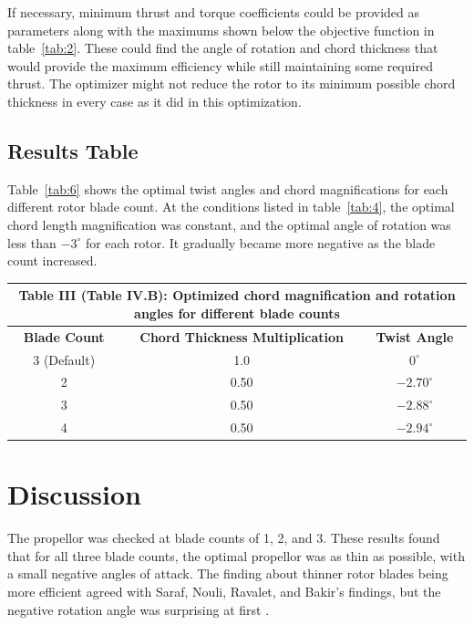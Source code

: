 \documentclass[journal ]{new-aiaa}
\begin{document}
If necessary, minimum thrust and torque coefficients could be provided as parameters along with the maximums shown below the objective function in table~\eqref{tab:2}. These could find the angle of rotation and chord thickness that would provide the maximum efficiency while still maintaining some required thrust. The optimizer might not reduce the rotor to its minimum possible chord thickness in every case as it did in this optimization.

\subsection{Results Table}

Table~\eqref{tab:6} shows the optimal twist angles and chord magnifications for each different rotor blade count. At the conditions listed in table~\eqref{tab:4}, the optimal chord length magnification was constant, and the optimal angle of rotation was less than $-3^{\circ}$ for each rotor. It gradually became more negative as the blade count increased.

\begin{center}
\begin{tabular}{| c | c | c |}
	 \multicolumn{3}{c}{Table III (Table IV.B): Optimized chord magnification and rotation angles for different blade counts}  \\ \hline
  	 \textbf{Blade Count} & \textbf{Chord Thickness Multiplication} & \textbf{Twist Angle} \\ \hline
  	 3 (Default) & 1.0 & $0^{\circ}$ \\ \hline
  	 2 & 0.50 & $-2.70^{\circ}$ \\ \hline
  	 3 & 0.50 & $-2.88^{\circ}$ \\ \hline
  	 4 & 0.50 & $-2.94^{\circ}$ \\ \hline
\end{tabular}
\label{tab:6}
\end{center}


\section{Discussion}

The propellor was checked at blade counts of 1, 2, and 3. These results found that for all three blade counts, the optimal propellor was as thin as possible, with a small negative angles of attack. The finding about thinner rotor blades being more efficient agreed with Saraf, Nouli, Ravalet, and Bakir's findings, but the negative rotation angle was surprising at first \cite{AxFlFan}.
\end{document}
